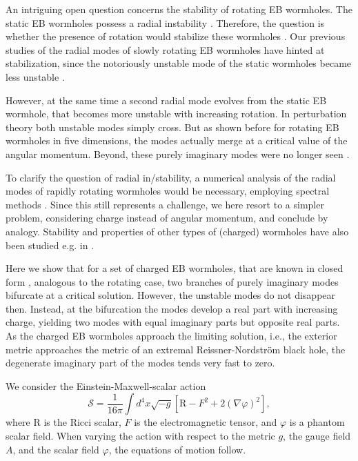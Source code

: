 \documentclass[floats,floatfix,showpacs,amssymb,prd,superscriptaddress,nofootinbib,nolongbibliography,reprint]{revtex4-2}
\newcommand\prlsec[1]{\vspace{2mm}\noindent {\textbf{  \textit{#1}}}}
\begin{document}
An intriguing open question concerns the stability of rotating EB wormholes.
The static EB wormholes possess a radial instability
\cite{Shinkai:2002gv,Gonzalez:2008wd,Gonzalez:2008xk,Cremona:2018wkj,Xu:2025jad}.
Therefore, the question is whether the presence of rotation would stabilize these wormholes \cite{Matos:2010pcd}.
Our previous studies of the radial modes of slowly rotating EB wormholes have hinted at stabilization, since the notoriously unstable mode of the static wormholes became less unstable \cite{Azad:2023iju,Azad:2024axu}.

However, at the same time a second radial mode evolves from the static EB wormhole, that becomes more unstable with increasing rotation.
In perturbation theory both unstable modes simply cross.
But as shown before for rotating EB wormholes in five dimensions, the modes actually merge at a critical value of the angular momentum.
Beyond, these purely imaginary modes were no longer seen \cite{Dzhunushaliev:2013jja}.

To clarify the question of radial in/stability, a numerical analysis of the radial modes of rapidly rotating wormholes would be necessary, employing spectral methods \cite{Blazquez-Salcedo:2023hwg,Khoo:2024yeh,Blazquez-Salcedo:2024oek, 
Blazquez-Salcedo:2024dur,Khoo:2024agm}.
Since this still represents a challenge, we here resort to a simpler problem, considering charge instead of angular momentum, and conclude by analogy.
Stability and properties of other types of (charged) wormholes have also been studied e.g. in \cite{Gonzalez:2009hn,Bronnikov:2012ch,Torii:2013xba,Nozawa:2020wet,DeFalco:2023twb,Ilyas:2023rde,Jaramillo:2023pny,Bronnikov:2025zgw}.

Here we show that for a set of charged EB wormholes, that are known in closed form \cite{Gonzalez:2009hn}, analogous to the rotating case, two branches of purely imaginary modes bifurcate at a critical solution.
However, the unstable modes do not disappear then.
Instead, at the bifurcation the modes develop a real part with increasing charge, yielding two modes with equal imaginary parts but opposite real parts.
As the charged EB wormholes approach the limiting solution, i.e., the exterior metric approaches the metric of an extremal Reissner-Nordstr\"om black hole, the degenerate imaginary part of the modes tends very fast
to zero.



\prlsec{Theoretical framework.}
We consider the Einstein-Maxwell-scalar action
\begin{equation}
    \mathcal{S}=\frac{1}{16\pi}\int d^4x\sqrt{-g}\left[ \mathrm{R}-F^2+2(\nabla\varphi)^2\right],
\end{equation}
where $\mathrm{R}$ is the Ricci scalar, $F$ is the electromagnetic tensor, and $\varphi$ is a phantom scalar field. 
When varying the action with respect to the metric $g$, the gauge field $A$, and the scalar field $\varphi$, the equations of motion follow.
\end{document}

